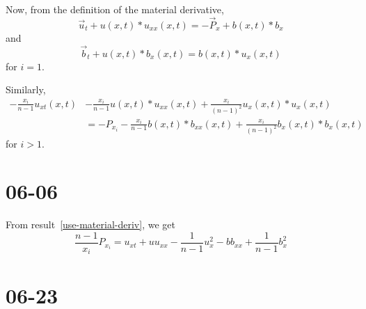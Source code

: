 \documentclass[11pt]{report}
\begin{document}
		\begin{result}
		\label{use-material-deriv}
			Now, from the definition of the material derivative,
			\begin{equation*}
				\vec{u}_t + u(x, t) * u_{xx}(x, t) = -\vec{P}_x + b(x, t) * b_x
			\end{equation*}
			and
			\begin{equation*}
				\vec{b}_t + u(x, t) * b_x(x, t) = b(x, t) * u_x(x, t)
			\end{equation*}
			for $i = 1$.

			\newpage
			
			Similarly,
			\begin{equation*}
				\begin{split}
					-\frac{x_i}{n - 1} u_{xt}(x, t) &-
						\frac{x_i}{n - 1} u(x, t) * u_{xx}(x, t) +
						\frac{x_i}{(n - 1)^2} u_x(x, t) * u_x(x, t) \\ 
					&= -P_{x_i} - \frac{x_i}{n- 1} b(x, t) * b_{xx}(x, t)
						+ \frac{x_i}{(n - 1)^2} b_x(x, t) * b_x(x, t)
				\end{split}
			\end{equation*}
			for $i > 1$.
		\end{result}
	
	\section*{06-06}
	From result~\ref{use-material-deriv}, we get
	\begin{equation*}
		\frac{n - 1}{x_i} P_{x_i} = u_{xt} + u u_{xx} - \frac{1}{n - 1} u_x^2 - b
		b_{xx} + \frac{1}{n - 1} b_x^2
	\end{equation*}

	\section*{06-23}
\end{document}
